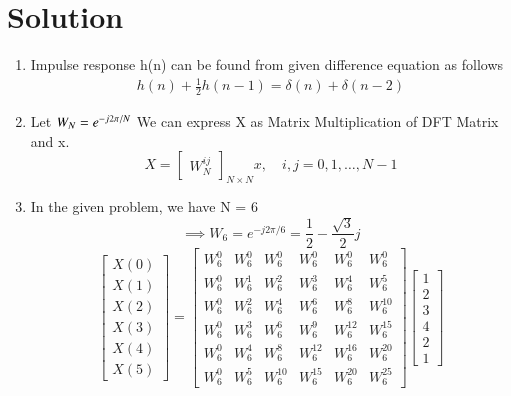 \documentclass[journal,12pt,twocolumn]{IEEEtran}
\renewcommand\thesection{\arabic{section}}
\begin{document}
\section{Solution}
\begin{enumerate}[label=\thesection.\arabic*.,ref=\thesection.\theenumi]
\item
Impulse response h(n) can be found from given difference equation as follows
\begin{align}
    h(n) + \frac{1}{2}h(n-1) = \delta(n) + \delta(n-2)	
\end{align}

\item
Let $W_{N} = e^{-j2\pi/N} \\$ 
We can express X as Matrix Multiplication of DFT Matrix and x.
\begin{equation}
X = 
\begin{bmatrix}
W^{ij}_{N} 
\end{bmatrix}_{N \times N}
x, \quad i,j = 0,1, \ldots, N-1
\end{equation}
\item
In the given problem, we have N = 6
\begin{equation}
\implies W_{6} = e^{-j2\pi/6} = \frac{1}{2}-\frac{\sqrt{3}}{2}j 
\end{equation}
\begin{equation}
\begin{bmatrix} 
X(0) \\ 
X(1) \\ 
X(2) \\ 
X(3) \\ 
X(4) \\ 
X(5) 
\end{bmatrix}
=
\begin{bmatrix}
W^{0}_{6} & W^{0}_{6} & W^{0}_{6} & W^{0}_{6} & W^{0}_{6} & W^{0}_{6}\\
W^{0}_{6} & W^{1}_{6} & W^{2}_{6} & W^{3}_{6} & W^{4}_{6} & W^{5}_{6}\\
W^{0}_{6} & W^{2}_{6} & W^{4}_{6} & W^{6}_{6} & W^{8}_{6} & W^{10}_{6}\\
W^{0}_{6} & W^{3}_{6} & W^{6}_{6} & W^{9}_{6} & W^{12}_{6} & W^{15}_{6}\\
W^{0}_{6} & W^{4}_{6} & W^{8}_{6} & W^{12}_{6} & W^{16}_{6} & W^{20}_{6}\\
W^{0}_{6} & W^{5}_{6} & W^{10}_{6} & W^{15}_{6} & W^{20}_{6} & W^{25}_{6} 
\end{bmatrix}
\begin{bmatrix}
1 \\ 
2 \\ 
3 \\ 
4 \\ 
2 \\ 
1
\end{bmatrix}
\end{equation}


\end{enumerate}
\end{document}
